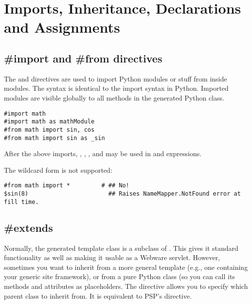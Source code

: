 \section{Imports, Inheritance, Declarations and Assignments}
\label{inheritanceEtc}


\subsection{\#import and \#from directives}
\label{inheritanceEtc.import}

The  and  directives are used to import Python
modules or stuff from inside modules.  The syntax is identical to the import
syntax in Python.  Imported modules are visible globally to all methods in the
generated Python class.

\begin{verbatim}
#import math
#import math as mathModule
#from math import sin, cos
#from math import sin as _sin
\end{verbatim}

After the above imports, , , 
,  and  may be used in 
 and expressions.

The wildcard form  is not supported:
\begin{verbatim}
#from math import *         # ## No!  
$sin(8)                       ## Raises NameMapper.NotFound error at fill time.
\end{verbatim}

\subsection{\#extends}
\label{inheritanceEtc.extends}

Normally, the generated template class is a subclass of
.  This gives it standard 
functionality as well as making it usable as a Webware servlet.  However,
sometimes you want to inherit from a more general template (e.g., one
containing your generic site framework), or from a pure Python class (so you
can call its methods and attributes as placeholders.  The 
directive allows you to specify which parent class to inherit from.  It is
equivalent to PSP's  directive. 

